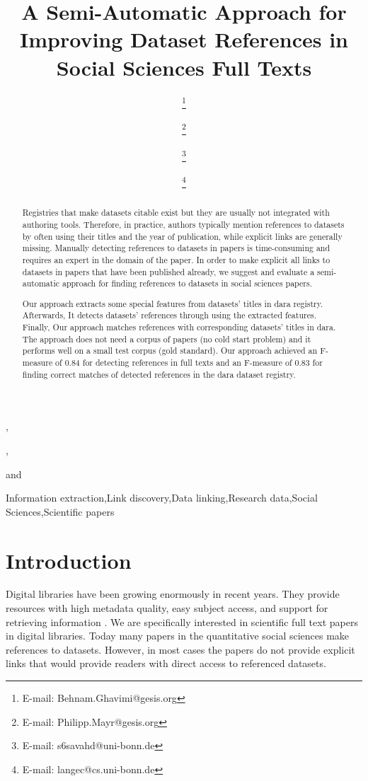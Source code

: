 \documentclass{IOS-Book-Article}
\newcommand{\dara}{\textsf{da\textbar ra}}
\begin{document}
\pagestyle{headings}
\def\thepage{}

\begin{frontmatter}
\title{A Semi-Automatic Approach for Improving Dataset References in Social Sciences Full Texts}

\author[A,B]{ 
\thanks{E-mail: Behnam.Ghavimi@gesis.org}},
\author[A]{ 
\thanks{E-mail: Philipp.Mayr@gesis.org}},
\author[B]{ 
\thanks{E-mail: s6savahd@uni-bonn.de}}
and
\author[B,C]{  
\thanks{E-mail: langec@cs.uni-bonn.de}}

\address[A]{GESIS – Leibniz Institute for the Social Sciences}
\address[B]{University of Bonn}
\address[C]{Fraunhofer IAIS}
\begin{abstract}

Registries that make datasets citable exist but they are usually not integrated with authoring tools. Therefore, in practice, authors typically mention references to datasets by often using their titles and the year of publication, while explicit links are generally missing.
Manually detecting references to datasets in papers is time-consuming and requires an expert in the domain of the paper. In order to make explicit all links to datasets in papers that have been published already, we suggest and evaluate a semi-automatic approach for finding references to datasets in social sciences papers.

Our approach extracts some special features from datasets' titles in {\dara} registry. Afterwards, It detects datasets' references through using the extracted features. Finally, Our approach matches references with corresponding datasets' titles in {\dara}. The approach does not need a corpus of papers (no cold start problem) and it performs well on a small test corpus (gold standard). Our approach achieved an F-measure of 0.84 for detecting references in full texts and an F-measure of 0.83 for finding correct matches of detected references in the {\dara} dataset registry.
\end{abstract}

\begin{keyword}
Information extraction\sep Link discovery\sep Data linking\sep Research data\sep Social Sciences\sep Scientific papers
\end{keyword}
\end{frontmatter}
\section{Introduction}
Digital libraries have been growing enormously in recent years.
They provide resources with high metadata quality, easy subject access, and support for retrieving information \citep{Hienert2015}. 
We are specifically interested in scientific full text papers in digital libraries.
Today many papers in the quantitative social sciences make references to datasets. 
However, in most cases the papers do not provide explicit links that would provide readers with direct access to referenced datasets. 
\end{document}
